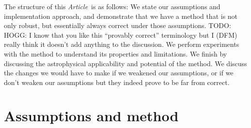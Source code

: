 \documentclass[manuscript, letterpaper]{aastex6}
\newcommand{\documentname}{\textsl{Article}}
\newcommand{\todo}[1]{{\color{red}TODO: #1}}
\begin{document}
The structure of this \documentname\ is as follows:
We state our assumptions and implementation approach, and demonstrate that we
have a method that is not only robust, but essentially always correct under
those assumptions.
\todo{HOGG: I know that you like this ``provably correct'' terminology but I
(DFM) really think it doesn't add anything to the discussion.}
We perform experiments with the method to understand its properties and
limitations.
We finish by discussing the astrophysical applicability and potential of the
method.
We discuss the changes we would have to make if we weakened our assumptions, or
if we don't weaken our assumptions but they indeed prove to be far from correct.

\section{Assumptions and method} \label{sec:method}
\end{document}
